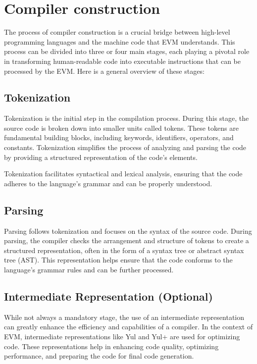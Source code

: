 \section{Compiler construction}
\label{sec:cc}

The process of compiler construction is a crucial bridge between high-level programming languages and the machine code that EVM understands. This process can be divided into three or four main stages, each playing a pivotal role in transforming human-readable code into executable instructions that can be processed by the EVM. Here is a general overview of these stages:

\subsection{Tokenization}
Tokenization is the initial step in the compilation process. During this stage, the source code is broken down into smaller units called tokens. These tokens are fundamental building blocks, including keywords, identifiers, operators, and constants. Tokenization simplifies the process of analyzing and parsing the code by providing a structured representation of the code's elements.

Tokenization facilitates syntactical and lexical analysis, ensuring that the code adheres to the language's grammar and can be properly understood.

\subsection{Parsing}

Parsing follows tokenization and focuses on the syntax of the source code. During parsing, the compiler checks the arrangement and structure of tokens to create a structured representation, often in the form of a syntax tree or abstract syntax tree (AST). This representation helps ensure that the code conforms to the language's grammar rules and can be further processed.

\subsection{Intermediate Representation (Optional)}

While not always a mandatory stage, the use of an intermediate representation can greatly enhance the efficiency and capabilities of a compiler. In the context of EVM, intermediate representations like Yul and Yul+ are used for optimizing code. These representations help in enhancing code quality, optimizing performance, and preparing the code for final code generation.

